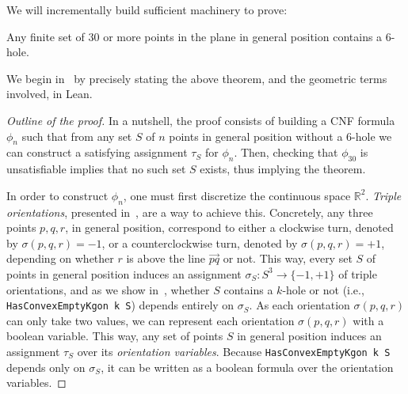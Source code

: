 We will incrementally build sufficient machinery to prove:

\begin{theorem*}
Any finite set of $30$ or more points in the plane in general position contains a $6$-hole.
\end{theorem*}

We begin in~ by precisely stating the above theorem,
    and the geometric terms involved, in Lean.


\begin{proof}[Outline of the proof]
In a nutshell, the proof consists of building a CNF formula $\phi_n$ such that 
from any set $S$ of $n$ points in general position without a $6$-hole we can construct a satisfying assignment $\tau_S$ for $\phi_n$.
Then, checking that $\phi_{30}$ is unsatisfiable implies that no such set $S$ exists, thus implying the theorem. 

In order to construct $\phi_n$, one must first discretize the continuous space $\mathbb{R}^2$. \emph{Triple orientations}, presented in~, are a way to achieve this. Concretely, any three points $p,q,r$, in general position, correspond to either a clockwise turn, denoted by $\sigma(p, q, r) = -1$, or a counterclockwise turn, denoted by $\sigma(p, q, r) = +1$, depending on whether $r$ is above the line $\vec{pq}$ or not. 
This way, every set $S$ of points in general position induces an assignment $\sigma_S: S^3 \to \{-1,+1\}$
of triple orientations, and as we show in~, whether $S$ contains a $k$-hole or not (i.e., \lstinline|HasConvexEmptyKgon k S|) depends entirely on $\sigma_S$. 
As each orientation $\sigma(p, q, r)$ can only take two values, we can represent each orientation $\sigma(p,q,r)$ with a boolean variable. This way, any set of points $S$ in general position induces an assignment $\tau_S$ over its \emph{orientation variables}. 
Because \lstinline|HasConvexEmptyKgon k S| depends only on $\sigma_S$, it can be written as a boolean formula over the orientation variables.



\end{proof}
